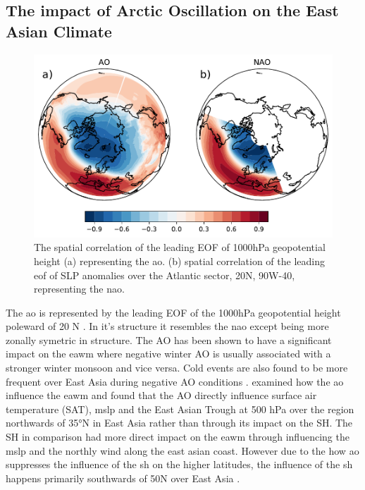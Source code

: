 \subsection{The impact of Arctic Oscillation on the East Asian Climate}
\begin{figure}[htpb]
    \centering
    \includegraphics[width=\textwidth]{texfiles/figs/EOF_AO_NAO.pdf}
    \caption{The spatial correlation of the leading EOF of 1000hPa geopotential height (a) representing the \acrshort{ao}. (b)  spatial correlation of the leading \acrshort{eof}  of SLP anomalies over the Atlantic sector, 20\degree N, 90\degree W-40\degree, representing the \acrshort{nao}.}
    \label{fig:EOF_NAO_AO}
\end{figure}
The \acrfull{ao} is represented by the leading EOF of the 1000hPa geopotential height poleward of 20 \degree N \parencite{thompson1998arctic}. In it's structure it resembles the \acrfull{nao} except being more zonally symetric in structure. The AO has been shown to have a significant impact on the \acrshort{eawm} where negative winter AO is usually associated with a stronger winter monsoon and vice versa. Cold events are also found to be more frequent over East Asia during negative AO conditions \parencite{he2017impact}. \textcite{wu2002winter} examined how the \acrshort{ao} influence the \acrshort{eawm} and found that the AO directly influence surface air temperature (SAT), \acrshort{mslp} and the East Asian Trough at 500 hPa over the region northwards of 35°N in East Asia rather than through its impact on the SH. The SH in comparison had more direct impact on the \acrshort{eawm} through influencing the \acrshort{mslp} and the northly wind along the east asian coast. However due to the how \acrshort{ao} suppresses the influence of the \acrshort{sh} on the higher latitudes, the influence of the \acrshort{sh} happens primarily southwards of 50\degree N over East Asia \parencite{wu2002winter}. 

